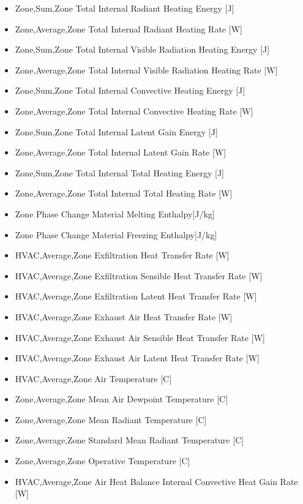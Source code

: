 \begin{itemize}
\item
  Zone,Sum,Zone Total Internal Radiant Heating Energy {[}J{]}
\item
  Zone,Average,Zone Total Internal Radiant Heating Rate {[}W{]}
\item
  Zone,Sum,Zone Total Internal Visible Radiation Heating Energy {[}J{]}
\item
  Zone,Average,Zone Total Internal Visible Radiation Heating Rate {[}W{]}
\item
  Zone,Sum,Zone Total Internal Convective Heating Energy {[}J{]}
\item
  Zone,Average,Zone Total Internal Convective Heating Rate {[}W{]}
\item
  Zone,Sum,Zone Total Internal Latent Gain Energy {[}J{]}
\item
  Zone,Average,Zone Total Internal Latent Gain Rate {[}W{]}
\item
  Zone,Sum,Zone Total Internal Total Heating Energy {[}J{]}
\item
  Zone,Average,Zone Total Internal Total Heating Rate {[}W{]}
 \item
  Zone Phase Change Material Melting Enthalpy{[{J/kg}]}
 \item
  Zone Phase Change Material Freezing Enthalpy{[{J/kg}]}
\item
  HVAC,Average,Zone Exfiltration Heat Transfer Rate {[}W{]}
\item
  HVAC,Average,Zone Exfiltration Sensible Heat Transfer Rate {[}W{]}
\item
  HVAC,Average,Zone Exfiltration Latent Heat Transfer Rate {[}W{]}
\item
  HVAC,Average,Zone Exhaust Air Heat Transfer Rate {[}W{]}
\item
  HVAC,Average,Zone Exhaust Air Sensible Heat Transfer Rate {[}W{]}
\item
  HVAC,Average,Zone Exhaust Air Latent Heat Transfer Rate {[}W{]}
\item
  HVAC,Average,Zone Air Temperature {[}C{]}
\item
  Zone,Average,Zone Mean Air Dewpoint Temperature {[}C{]}
\item
  Zone,Average,Zone Mean Radiant Temperature {[}C{]}
\item
  Zone,Average,Zone Standard Mean Radiant Temperature {[}C{]}
\item
  Zone,Average,Zone Operative Temperature {[}C{]}
\item
  HVAC,Average,Zone Air Heat Balance Internal Convective Heat Gain Rate {[}W{]}

\end{itemize}
